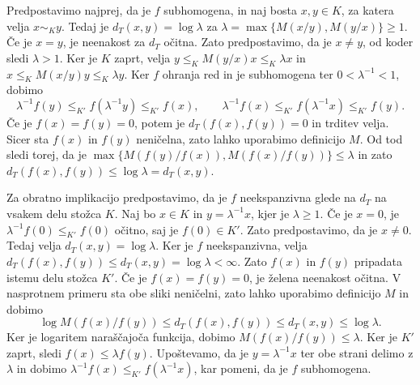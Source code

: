 \documentclass[mat2, tisk]{fmfdelo}
\begin{document}
\begin{dokaz}
  Predpostavimo najprej, da je $f$ subhomogena, in naj bosta
  $x,y\in K$, za katera velja $x\sim_K y$. Tedaj je
  $d_T(x,y)=\log\lambda$ za  $\lambda = \max\{M(x/y),M(y/x)\} \geq 1$. 
  Če je $x=y$, je neenakost za $d_T$ očitna.
  Zato predpostavimo, da je $x\neq y$,
  od koder sledi $\lambda>1$.
  Ker je $K$ zaprt, velja $y\leq_K M(y/x)x\leq_K\lambda x$ in
  $x\leq_K M(x/y)y\leq_K\lambda y$. Ker $f$ ohranja red
  in je subhomogena ter $ 0 < \lambda^{-1} < 1 $, dobimo
  \begin{equation}\label{eq:subhom-neekspanzivnost}
\lambda^{-1}f(y)
\leq_{K'}f(\lambda^{-1}y)
\leq_{K'}f(x),
\qquad
\lambda^{-1}f(x)
\leq_{K'}f(\lambda^{-1}x)
\leq_{K'}f(y).
\end{equation}
  Če je $f(x)=f(y)=0$, potem je
  $d_T(f(x),f(y))=0$ in trditev velja.
  Sicer sta $f(x)$ in $f(y)$ neničelna,
  zato lahko uporabimo definicijo $M$.
  Od tod sledi torej, da je 
  $\max\{M(f(y)/f(x)),M(f(x)/f(y))\}\leq\lambda$ in zato
  $d_T(f(x),f(y))\leq\log\lambda=d_T(x,y)$.

  Za obratno implikacijo predpostavimo, da je $f$ neekspanzivna glede
  na $d_T$ na vsakem delu stožca $K$. Naj bo $x\in K$ in
  $y=\lambda^{-1}x$, kjer je $\lambda\geq1$. Če je $x=0$, je
  $\lambda^{-1}f(0)\leq_{K'}f(0)$
  očitno, saj je $f(0)\in K'$.
  Zato predpostavimo, da je $x\neq0$.
  Tedaj velja $d_T(x,y)=\log\lambda$.
  Ker je $f$ neekspanzivna, velja
  $d_T(f(x),f(y))\leq d_T(x,y)=\log\lambda<\infty$.
  Zato $f(x)$ in $f(y)$ pripadata istemu delu stožca $K'$.
  Če je $f(x)=f(y)=0$, je želena neenakost očitna.
  V nasprotnem primeru sta obe sliki neničelni,
  zato lahko uporabimo definicijo $M$ in dobimo
  \[
  \log M(f(x)/f(y))
  \leq d_T(f(x),f(y)) \leq d_T(x,y)
  \leq\log\lambda.
  \]
  Ker je logaritem naraščajoča funkcija, dobimo $M(f(x)/f(y)) \leq \lambda$. 
  Ker je $K'$ zaprt, sledi $f(x) \leq \lambda f(y)$. Upoštevamo, da je 
  $ y = \lambda^{-1} x$ ter obe strani delimo z $\lambda$ in dobimo
  $\lambda^{-1}f(x)\leq_{K'}f(\lambda^{-1}x)$, kar pomeni, da je $f$
  subhomogena.


\end{dokaz}
\end{document}
